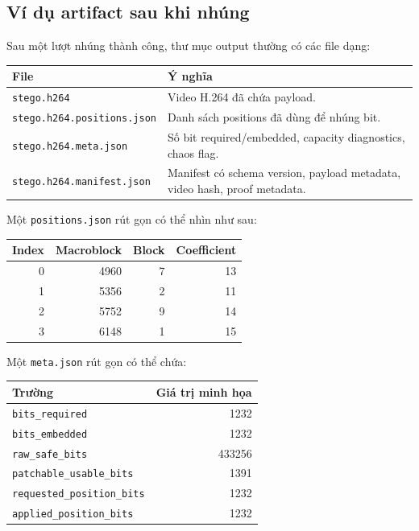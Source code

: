 \documentclass[11pt,a4paper]{article}
\begin{document}
\subsection{Ví dụ artifact sau khi nhúng}

Sau một lượt nhúng thành công, thư mục output thường có các file dạng:

\begin{center}
\begin{tabular}{lp{88mm}}
\toprule
File & Ý nghĩa \\
\midrule
\texttt{stego.h264} & Video H.264 đã chứa payload. \\
\texttt{stego.h264.positions.json} & Danh sách positions đã dùng để nhúng bit. \\
\texttt{stego.h264.meta.json} & Số bit required/embedded, capacity diagnostics, chaos flag. \\
\texttt{stego.h264.manifest.json} & Manifest có schema version, payload metadata, video hash, proof metadata. \\
\bottomrule
\end{tabular}
\end{center}

Một \texttt{positions.json} rút gọn có thể nhìn như sau:

\begin{center}
\begin{tabular}{rrrr}
\toprule
Index & Macroblock & Block & Coefficient \\
\midrule
0 & 4960 & 7 & 13 \\
1 & 5356 & 2 & 11 \\
2 & 5752 & 9 & 14 \\
3 & 6148 & 1 & 15 \\
\bottomrule
\end{tabular}
\end{center}

Một \texttt{meta.json} rút gọn có thể chứa:

\begin{center}
\begin{tabular}{lr}
\toprule
Trường & Giá trị minh họa \\
\midrule
\texttt{bits\_required} & 1232 \\
\texttt{bits\_embedded} & 1232 \\
\texttt{raw\_safe\_bits} & 433256 \\
\texttt{patchable\_usable\_bits} & 1391 \\
\texttt{requested\_position\_bits} & 1232 \\
\texttt{applied\_position\_bits} & 1232 \\
\bottomrule
\end{tabular}
\end{center}
\end{document}
